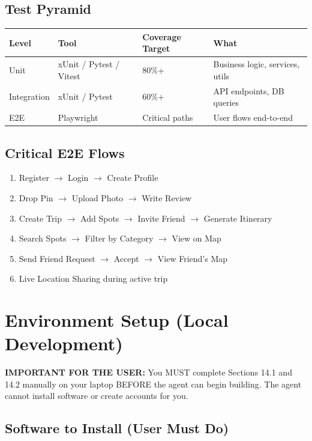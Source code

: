 \documentclass[12pt,letterpaper]{article}
\begin{document}
\subsection{Test Pyramid}
\begin{tabular}{|l|l|l|l|}
\hline
\textbf{Level} & \textbf{Tool} & \textbf{Coverage Target} & \textbf{What} \\
\hline
Unit & xUnit / Pytest / Vitest & 80\%+ & Business logic, services, utils \\
Integration & xUnit / Pytest & 60\%+ & API endpoints, DB queries \\
E2E & Playwright & Critical paths & User flows end-to-end \\
\hline
\end{tabular}

\subsection{Critical E2E Flows}
\begin{enumerate}
  \item Register $\rightarrow$ Login $\rightarrow$ Create Profile
  \item Drop Pin $\rightarrow$ Upload Photo $\rightarrow$ Write Review
  \item Create Trip $\rightarrow$ Add Spots $\rightarrow$ Invite Friend $\rightarrow$ Generate Itinerary
  \item Search Spots $\rightarrow$ Filter by Category $\rightarrow$ View on Map
  \item Send Friend Request $\rightarrow$ Accept $\rightarrow$ View Friend's Map
  \item Live Location Sharing during active trip
\end{enumerate}

\newpage

\section{Environment Setup (Local Development)}

\textbf{IMPORTANT FOR THE USER:} You MUST complete Sections 14.1 and 14.2 manually on your laptop BEFORE the agent can begin building. The agent cannot install software or create accounts for you.

\subsection{Software to Install (User Must Do)}
\end{document}

